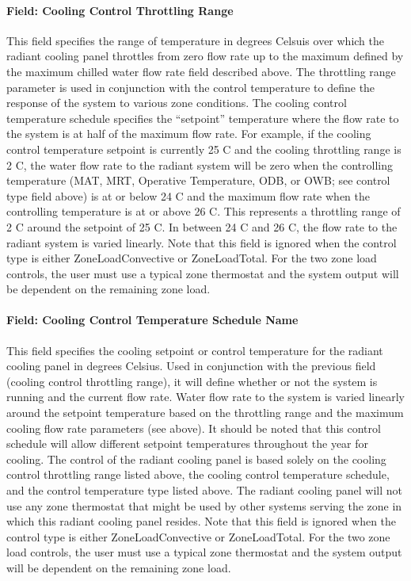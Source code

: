 \paragraph{Field: Cooling Control Throttling Range}

This field specifies the range of temperature in degrees Celsuis over which the radiant cooling panel throttles from zero flow rate up to the maximum defined by the maximum chilled water flow rate field described above. The throttling range parameter is used in conjunction with the control temperature to define the response of the system to various zone conditions. The cooling control temperature schedule specifies the “setpoint” temperature where the flow rate to the system is at half of the maximum flow rate. For example, if the cooling control temperature setpoint is currently 25 C and the cooling throttling range is 2 C, the water flow rate to the radiant system will be zero when the controlling temperature (MAT, MRT, Operative Temperature, ODB, or OWB; see control type field above) is at or below 24 C and the maximum flow rate when the controlling temperature is at or above 26 C. This represents a throttling range of 2 C around the setpoint of 25 C. In between 24 C and 26 C, the flow rate to the radiant system is varied linearly.  Note that this field is ignored when the control type is either ZoneLoadConvective or ZoneLoadTotal.  For the two zone load controls, the user must use a typical zone thermostat and the system output will be dependent on the remaining zone load.

\paragraph{Field: Cooling Control Temperature Schedule Name}

This field specifies the cooling setpoint or control temperature for the radiant cooling panel in degrees Celsius. Used in conjunction with the previous field (cooling control throttling range), it will define whether or not the system is running and the current flow rate. Water flow rate to the system is varied linearly around the setpoint temperature based on the throttling range and the maximum cooling flow rate parameters (see above). It should be noted that this control schedule will allow different setpoint temperatures throughout the year for cooling. The control of the radiant cooling panel is based solely on the cooling control throttling range listed above, the cooling control temperature schedule, and the control temperature type listed above. The radiant cooling panel will not use any zone thermostat that might be used by other systems serving the zone in which this radiant cooling panel resides.  Note that this field is ignored when the control type is either ZoneLoadConvective or ZoneLoadTotal.  For the two zone load controls, the user must use a typical zone thermostat and the system output will be dependent on the remaining zone load.

